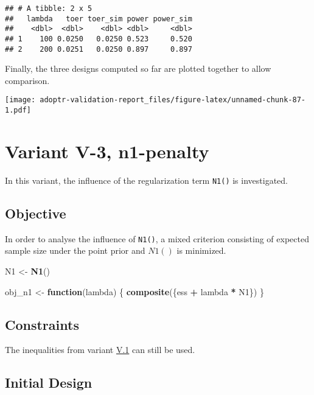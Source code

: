\documentclass[]{book}
\newenvironment{Shaded}{\begin{snugshade}}{\end{snugshade}}
\newcommand{\ControlFlowTok}[1]{\textcolor[rgb]{0.13,0.29,0.53}{\textbf{#1}}}
\newcommand{\KeywordTok}[1]{\textcolor[rgb]{0.13,0.29,0.53}{\textbf{#1}}}
\newcommand{\NormalTok}[1]{#1}
\newcommand{\OperatorTok}[1]{\textcolor[rgb]{0.81,0.36,0.00}{\textbf{#1}}}
\newcommand{\StringTok}[1]{\textcolor[rgb]{0.31,0.60,0.02}{#1}}
\begin{document}
\begin{verbatim}
## # A tibble: 2 x 5
##   lambda   toer toer_sim power power_sim
##    <dbl>  <dbl>    <dbl> <dbl>     <dbl>
## 1    100 0.0250   0.0250 0.523     0.520
## 2    200 0.0251   0.0250 0.897     0.897
\end{verbatim}

Finally, the three designs computed so far are plotted together to allow
comparison.

\texttt{[image: adoptr-validation-report\_files/figure-latex/unnamed-chunk-87-1.pdf]}

\hypertarget{variantV_3}{%
\section{Variant V-3, n1-penalty}\label{variantV_3}}

In this variant, the influence of the regularization term \texttt{N1()} is investigated.

\hypertarget{objective-12}{%
\subsection{Objective}\label{objective-12}}

In order to analyse the influence of \texttt{N1()},
a mixed criterion consisting of expected sample size under the point prior
and \(N1()\) is minimized.

\begin{Shaded}
\begin{Highlighting}[]
\NormalTok{N1 <-}\StringTok{ }\KeywordTok{N1}\NormalTok{()}

\NormalTok{obj_n1 <-}\StringTok{ }\ControlFlowTok{function}\NormalTok{(lambda) \{}
  \KeywordTok{composite}\NormalTok{(\{ess }\OperatorTok{+}\StringTok{ }\NormalTok{lambda }\OperatorTok{*}\StringTok{ }\NormalTok{N1\})}
\NormalTok{\}}
\end{Highlighting}
\end{Shaded}

\hypertarget{constraints-12}{%
\subsection{Constraints}\label{constraints-12}}

The inequalities from variant \protect\hyperlink{variantV_1}{V.1} can still be used.

\hypertarget{initial-design-10}{%
\subsection{Initial Design}\label{initial-design-10}}
\end{document}
